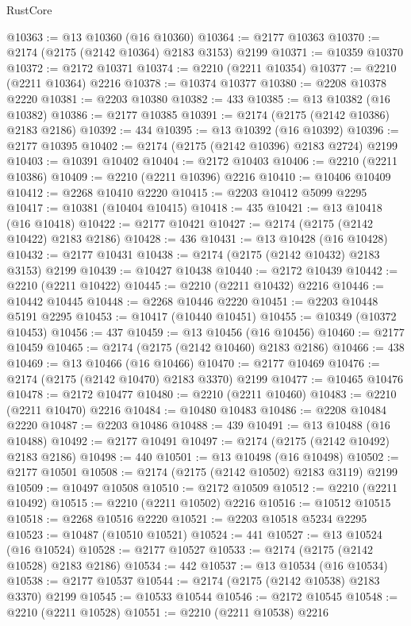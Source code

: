 \begin{lexlean}{RustCore}
\begin{coremodule}
@10363 := @13 @10360 (@16 @10360)
@10364 := @2177 @10363
@10370 := @2174 (@2175 (@2142 @10364) @2183 @3153) @2199
@10371 := @10359 @10370
@10372 := @2172 @10371
@10374 := @2210 (@2211 @10354)
@10377 := @2210 (@2211 @10364) @2216
@10378 := @10374 @10377
@10380 := @2208 @10378 @2220
@10381 := @2203 @10380
@10382 := 433
@10385 := @13 @10382 (@16 @10382)
@10386 := @2177 @10385
@10391 := @2174 (@2175 (@2142 @10386) @2183 @2186)
@10392 := 434
@10395 := @13 @10392 (@16 @10392)
@10396 := @2177 @10395
@10402 := @2174 (@2175 (@2142 @10396) @2183 @2724) @2199
@10403 := @10391 @10402
@10404 := @2172 @10403
@10406 := @2210 (@2211 @10386)
@10409 := @2210 (@2211 @10396) @2216
@10410 := @10406 @10409
@10412 := @2268 @10410 @2220
@10415 := @2203 @10412 @5099 @2295
@10417 := @10381 (@10404 @10415)
@10418 := 435
@10421 := @13 @10418 (@16 @10418)
@10422 := @2177 @10421
@10427 := @2174 (@2175 (@2142 @10422) @2183 @2186)
@10428 := 436
@10431 := @13 @10428 (@16 @10428)
@10432 := @2177 @10431
@10438 := @2174 (@2175 (@2142 @10432) @2183 @3153) @2199
@10439 := @10427 @10438
@10440 := @2172 @10439
@10442 := @2210 (@2211 @10422)
@10445 := @2210 (@2211 @10432) @2216
@10446 := @10442 @10445
@10448 := @2268 @10446 @2220
@10451 := @2203 @10448 @5191 @2295
@10453 := @10417 (@10440 @10451)
@10455 := @10349 (@10372 @10453)
@10456 := 437
@10459 := @13 @10456 (@16 @10456)
@10460 := @2177 @10459
@10465 := @2174 (@2175 (@2142 @10460) @2183 @2186)
@10466 := 438
@10469 := @13 @10466 (@16 @10466)
@10470 := @2177 @10469
@10476 := @2174 (@2175 (@2142 @10470) @2183 @3370) @2199
@10477 := @10465 @10476
@10478 := @2172 @10477
@10480 := @2210 (@2211 @10460)
@10483 := @2210 (@2211 @10470) @2216
@10484 := @10480 @10483
@10486 := @2208 @10484 @2220
@10487 := @2203 @10486
@10488 := 439
@10491 := @13 @10488 (@16 @10488)
@10492 := @2177 @10491
@10497 := @2174 (@2175 (@2142 @10492) @2183 @2186)
@10498 := 440
@10501 := @13 @10498 (@16 @10498)
@10502 := @2177 @10501
@10508 := @2174 (@2175 (@2142 @10502) @2183 @3119) @2199
@10509 := @10497 @10508
@10510 := @2172 @10509
@10512 := @2210 (@2211 @10492)
@10515 := @2210 (@2211 @10502) @2216
@10516 := @10512 @10515
@10518 := @2268 @10516 @2220
@10521 := @2203 @10518 @5234 @2295
@10523 := @10487 (@10510 @10521)
@10524 := 441
@10527 := @13 @10524 (@16 @10524)
@10528 := @2177 @10527
@10533 := @2174 (@2175 (@2142 @10528) @2183 @2186)
@10534 := 442
@10537 := @13 @10534 (@16 @10534)
@10538 := @2177 @10537
@10544 := @2174 (@2175 (@2142 @10538) @2183 @3370) @2199
@10545 := @10533 @10544
@10546 := @2172 @10545
@10548 := @2210 (@2211 @10528)
@10551 := @2210 (@2211 @10538) @2216

\end{coremodule}
\end{lexlean}
